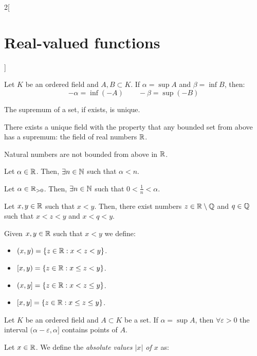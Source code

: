 \documentclass[../../../main.tex]{subfiles}
\begin{document}
\begin{multicols}{2}[\section{Real-valued functions}]
\begin{prop}
        Let $K$ be an ordered field and $A,B\subset K$. If $\alpha=\sup A$ and $\beta=\inf B$, then: $$-\alpha=\inf(-A)\qquad-\beta=\sup(-B)$$
    \end{prop}
    \begin{prop}
        The supremum of a set, if exists, is unique.
    \end{prop}
    \begin{theorem}
        There exists a unique field with the property that any bounded set from above has a supremum: the field of real numbers $\mathbb{R}$.
    \end{theorem}
    \begin{prop}
        Natural numbers are not bounded from above in $\mathbb{R}$.
    \end{prop}
    \begin{corollary}
        Let $\alpha\in\mathbb{R}$. Then, $\exists n\in\mathbb{N}$ such that $\alpha<n$.
    \end{corollary}
    \begin{corollary}
        Let $\alpha\in\mathbb{R}_{>0}$. Then, $\exists n\in\mathbb{N}$ such that $0<\frac{1}{n}<\alpha$.
    \end{corollary}
    \begin{prop}
        Let $x,y\in\mathbb{R}$ such that $x<y$. Then, there exist numbers $z\in\mathbb{R}\setminus\mathbb{Q}$ and $q\in\mathbb{Q}$ such that $x<z<y$ and $x<q<y$.
    \end{prop}
    \begin{definition}
        Given $x,y\in\mathbb{R}$ such that $x<y$ we define:
        \begin{itemize}
            \item $(x,y)=\{z\in\mathbb{R}:x<z<y\}$.
            \item $[x,y)=\{z\in\mathbb{R}:x\leq z<y\}$.
            \item $(x,y]=\{z\in\mathbb{R}:x<z\leq y\}$.
            \item $[x,y]=\{z\in\mathbb{R}:x\leq z\leq y\}$.
        \end{itemize}
    \end{definition}
    \begin{lemma}
        Let $K$ be an ordered field and $A\subset K$ be a set. If $\alpha=\sup A$, then $\forall \varepsilon>0$ the interval $(\alpha-\varepsilon,\alpha]$ contains points of $A$.
    \end{lemma}
    \begin{definition}
        Let $x\in\mathbb{R}$. We define the \textit{absolute values $|x|$ of $x$} as:
        \begin{equation*}

\end{equation*}
\end{definition}
\end{multicols}
\end{document}
